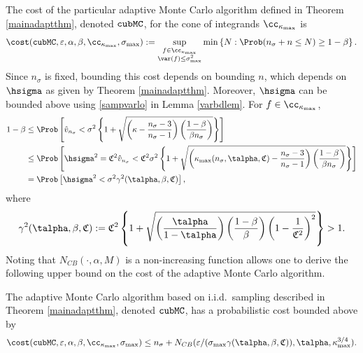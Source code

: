 \documentclass[graybox]{svmult}
\newcommand{\hv}{\hat{v}}
\newcommand{\fudge}{\mathfrak{C}}
\newcommand{\aMC}{{\tt cubMC}\xspace}
\begin{document}
The cost of the particular adaptive Monte Carlo algorithm defined in Theorem \ref{mainadaptthm}, denoted $\aMC$, for the cone of integrands $\cc_{\kappa_{\max}}$ is
\begin{equation}
\cost(\aMC,\varepsilon,\alpha, \beta, \cc_{\kappa_{\max}}, \sigma_{\max}) := \sup_{\substack{f \in \cc_{\kappa_{\max}}\\ \var(f)\le \sigma^2_{\max}} } \min\left\{N : \Prob(n_{\sigma} + n \le N) \ge 1-\beta  \right \}.
\end{equation}
Since $n_{\sigma}$ is fixed, bounding this cost depends on bounding $n$, which depends on $\hsigma$ as given by Theorem \ref{mainadaptthm}.  Moreover, $\hsigma$ can be bounded above using \eqref{sampvarlo} in Lemma \ref{varbdlem}.  For $f \in \cc_{\kappa_{\max}}$, 
\begin{align*}
1-\beta & \le \Prob\left[\hv_{n_{\sigma}} < \sigma^2 \left\{1 + \sqrt{\left ( \kappa  - \frac{n_{\sigma}-3}{n_{\sigma}-1}\right)\left(\frac{1-\beta}{\beta n_{\sigma}}\right)}\right\} \right] \\
& \le \Prob\left[\hsigma^2 = \fudge^2 \hv_{n_{\sigma}} < \fudge^2\sigma^2 \left\{1 + \sqrt{\left ( \kappa_{\max}(n_{\sigma},\talpha,\fudge)  - \frac{n_{\sigma}-3}{n_{\sigma}-1}\right)\left(\frac{1-\beta}{\beta n_{\sigma}}\right)}\right\} \right] \\
& = \Prob\left[\hsigma^2 < \sigma^2 \gamma^2(\talpha,\beta,\fudge) \right],
\end{align*}
where
\[
\gamma^2(\talpha,\beta,\fudge) := \fudge^2 \left\{1 + \sqrt{\left(\frac{ \talpha }{1-\talpha}\right) \left(\frac{1-\beta}{\beta}\right) \left(1 - \frac{1}{\fudge^2}\right)^2}\right\} > 1.
\]
Noting that $N_{CB}(\cdot,\alpha,M)$ is a non-increasing function allows one to derive the following upper bound on the cost of the adaptive Monte Carlo algorithm.

\begin{theorem} \label{costtheorem} The adaptive Monte Carlo algorithm based on i.i.d.\ sampling described in Theorem \ref{mainadaptthm}, denoted $\aMC$, has a probabilistic cost bounded above by 
\begin{equation*}
\cost(\aMC,\varepsilon,\alpha, \beta, \cc_{\kappa_{\max}}, \sigma_{\max})
\le n_{\sigma} + N_{CB}(\varepsilon/(\sigma_{\max}\gamma(\talpha,\beta,\fudge)),\talpha,\kappa_{\max}^{3/4}).
\end{equation*} 
\end{theorem}
\end{document}
